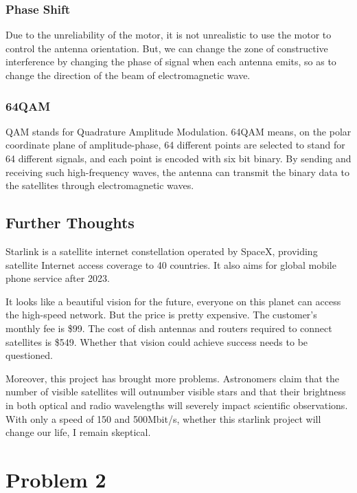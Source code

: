 \documentclass{article}
\begin{document}
\subsubsection{Phase Shift}
Due to the unreliability of the motor, it is not unrealistic to use the motor to control the antenna orientation. But, we can change the zone of constructive interference by changing the phase of signal when each antenna emits, so as to change the direction of the beam of electromagnetic wave.
\subsubsection{64QAM}
QAM stands for Quadrature Amplitude Modulation. 64QAM means, on the polar coordinate plane of amplitude-phase, 64 different points are selected to stand for 64 different signals, and each point is encoded with six bit binary. By sending and receiving such high-frequency waves, the antenna can transmit the binary data to the satellites through electromagnetic waves.
\subsection{Further Thoughts}
Starlink is a satellite internet constellation operated by SpaceX, providing satellite Internet access coverage to 40 countries. It also aims for global mobile phone service after 2023.\cite{wiki_starlink}

It looks like a  beautiful vision for the future, everyone on this planet can access the high-speed network. But the price is pretty expensive. The customer's monthly fee is \$99. The cost of dish antennas and routers required to connect satellites is \$549. Whether that vision could achieve success needs to be questioned.

Moreover, this project has brought more problems. Astronomers claim that the number of visible satellites will outnumber visible stars and that their brightness in both optical and radio wavelengths will severely impact scientific observations.\cite{BBC_starlink} With only a speed of 150 and 500Mbit/s, whether this starlink project will change our life, I remain skeptical.



\section{Problem 2}
\end{document}
